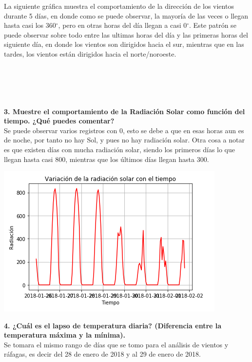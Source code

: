 \documentclass[12pt]{article}
\begin{document}
La siguiente gráfica muestra el comportamiento de la dirección de los vientos durante 5 días, en donde como se puede observar, la mayoría de las veces o llegan hasta casi los 360$^{\circ}$, pero en otras horas del día llegan a casi 0$^{\circ}$. Este patrón se puede observar sobre todo entre las ultimas horas del día y las primeras horas del siguiente día, en donde los vientos son dirigidos hacia el sur, mientras que en las tardes, los vientos están dirigidos hacia el norte/noroeste.\\ \\ \\ \\ \\ \\


\noindent\textbf {3. Muestre el comportamiento de la Radiación Solar como función del tiempo. ¿Qué puedes comentar? } \\

Se puede observar varios registros con 0, esto se debe a que en esas horas aun es de noche, por tanto no hay Sol, y pues no hay radiación solar. Otra cosa a notar es que existen días con mucha radiación solar, siendo los primeros días lo que llegan hasta casi 800, mientras que los últimos días llegan hasta 300.

\begin{center}
\includegraphics[scale=0.65]{RadSol.png}
\end{center}

\noindent\textbf {4. ¿Cuál es el lapso de temperatura diaria? (Diferencia entre la temperatura máxima y la mínima). } \\

Se tomara el mismo rango de días que se tomo para el análisis de vientos y ráfagas, es decir del 28 de enero de 2018 y al 29 de enero de 2018.\\
\end{document}
